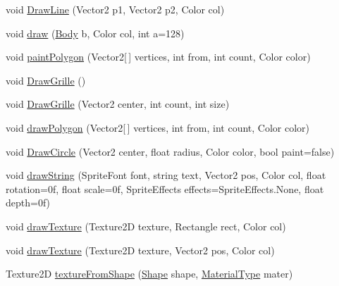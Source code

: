 \begin{DoxyCompactItemize}
\item 
void \hyperlink{classgearit_1_1src_1_1_draw_game_a5228bf21594bd3dd923a81a64ab85ad2}{Draw\+Line} (Vector2 p1, Vector2 p2, Color col)
\item 
void \hyperlink{classgearit_1_1src_1_1_draw_game_a8446a622b28f41a25435285eb377543d}{draw} (\hyperlink{class_farseer_physics_1_1_dynamics_1_1_body}{Body} b, Color col, int a=128)
\item 
void \hyperlink{classgearit_1_1src_1_1_draw_game_a89cbd1b99215d12050c3b19a3a693d5b}{paint\+Polygon} (Vector2\mbox{[}$\,$\mbox{]} vertices, int from, int count, Color color)
\item 
void \hyperlink{classgearit_1_1src_1_1_draw_game_afe178743c77d0ad9b4c9dd16d84c50b2}{Draw\+Grille} ()
\item 
void \hyperlink{classgearit_1_1src_1_1_draw_game_aa2c664f5f646cb06517798fc3415f1c2}{Draw\+Grille} (Vector2 center, int count, int size)
\item 
void \hyperlink{classgearit_1_1src_1_1_draw_game_a0bea1be1cf46216ff11330720ab89a5a}{draw\+Polygon} (Vector2\mbox{[}$\,$\mbox{]} vertices, int from, int count, Color color)
\item 
void \hyperlink{classgearit_1_1src_1_1_draw_game_a675ad19331f4b32bbe38fa48d20ef214}{Draw\+Circle} (Vector2 center, float radius, Color color, bool paint=false)
\item 
void \hyperlink{classgearit_1_1src_1_1_draw_game_a31eb1b354a4282be7cab5bd8a707a76d}{draw\+String} (Sprite\+Font font, string text, Vector2 pos, Color col, float rotation=0f, float scale=0f, Sprite\+Effects effects=\+Sprite\+Effects.\+None, float depth=0f)
\item 
void \hyperlink{classgearit_1_1src_1_1_draw_game_adbc6b684972c1ba6e0caf9b7843e3060}{draw\+Texture} (Texture2\+D texture, Rectangle rect, Color col)
\item 
void \hyperlink{classgearit_1_1src_1_1_draw_game_a20c626a80c6a9ba8714551e974cb2bcc}{draw\+Texture} (Texture2\+D texture, Vector2 pos, Color col)
\item 
Texture2\+D \hyperlink{classgearit_1_1src_1_1_draw_game_ad78496fe5db069574f87ca86074c9e88}{texture\+From\+Shape} (\hyperlink{class_farseer_physics_1_1_collision_1_1_shapes_1_1_shape}{Shape} shape, \hyperlink{namespacegearit_1_1src_1_1utility_a1a6b5ed88f62fe3a535053fa2d4fa491}{Material\+Type} mater)
\end{DoxyCompactItemize}


